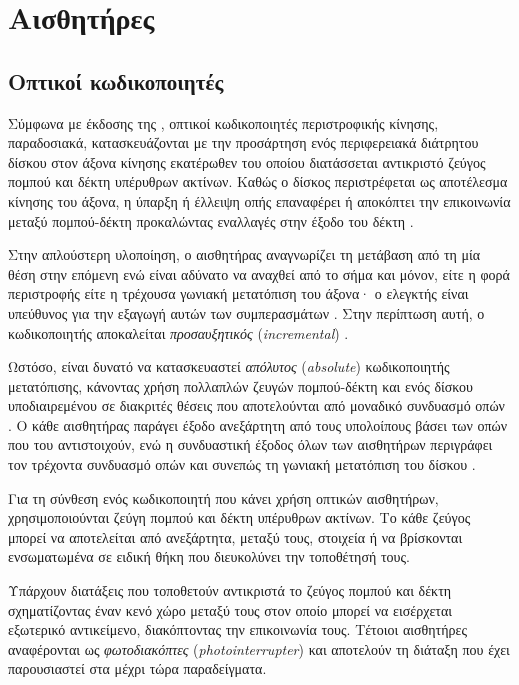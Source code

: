 \chapter{Αισθητήρες}

\section{Οπτικοί κωδικοποιητές}

Σύμφωνα με έκδοσης της \textcite[12]{drc76}, οπτικοί κωδικοποιητές περιστροφικής
κίνησης, παραδοσιακά, κατασκευάζονται με την προσάρτηση ενός περιφερειακά
διάτρητου δίσκου στον άξονα κίνησης εκατέρωθεν του οποίου διατάσσεται αντικριστό
ζεύγος πομπού και δέκτη υπέρυθρων ακτίνων. Καθώς ο δίσκος περιστρέφεται ως
αποτέλεσμα κίνησης του άξονα, η ύπαρξη ή έλλειψη οπής επαναφέρει ή αποκόπτει την
επικοινωνία μεταξύ πομπού-δέκτη προκαλώντας εναλλαγές στην έξοδο του δέκτη
\parencite[12]{drc76}.

Στην απλούστερη υλοποίηση, ο αισθητήρας αναγνωρίζει τη μετάβαση από τη μία θέση
στην επόμενη ενώ είναι αδύνατο να αναχθεί από το σήμα και μόνον, είτε η φορά
περιστροφής είτε η τρέχουσα γωνιακή μετατόπιση του άξονα· ο ελεγκτής είναι
υπεύθυνος για την εξαγωγή αυτών των συμπερασμάτων \parencites[5--6]{lynch02}
[13]{drc76}. Στην περίπτωση αυτή, ο κωδικοποιητής αποκαλείται
\emph{προσαυξητικός} (\emph{incremental})
\parencite[5]{lynch02}.

Ωστόσο, είναι δυνατό να κατασκευαστεί \emph{απόλυτος} (\emph{absolute})
κωδικοποιητής μετατόπισης, κάνοντας
χρήση πολλαπλών ζευγών πομπού-δέκτη και ενός δίσκου υποδιαιρεμένου σε διακριτές
θέσεις που αποτελούνται από μοναδικό συνδυασμό οπών \parencites[6]{lynch02}. Ο
κάθε αισθητήρας παράγει έξοδο ανεξάρτητη από τους υπολοίπους βάσει των οπών που
του αντιστοιχούν, ενώ η συνδυαστική έξοδος όλων των αισθητήρων περιγράφει τον
τρέχοντα συνδυασμό οπών και συνεπώς τη γωνιακή μετατόπιση του δίσκου
\parencites[6]{lynch02}.

Για τη σύνθεση ενός κωδικοποιητή που κάνει χρήση οπτικών αισθητήρων,
χρησιμοποιούνται ζεύγη πομπού και δέκτη υπέρυθρων ακτίνων. Το κάθε ζεύγος μπορεί
να αποτελείται από ανεξάρτητα, μεταξύ τους, στοιχεία ή να βρίσκονται
ενσωματωμένα σε ειδική θήκη που διευκολύνει την τοποθέτησή τους.

Υπάρχουν διατάξεις που τοποθετούν αντικριστά το ζεύγος πομπού και δέκτη
σχηματίζοντας έναν κενό χώρο μεταξύ τους στον οποίο μπορεί να εισέρχεται
εξωτερικό αντικείμενο, διακόπτοντας την επικοινωνία τους. Τέτοιοι αισθητήρες
αναφέρονται ως \emph{φωτοδιακόπτες}
(\emph{photointerrupter}) \parencite[3]{lynch02} και αποτελούν τη διάταξη που
έχει παρουσιαστεί στα μέχρι τώρα παραδείγματα.

